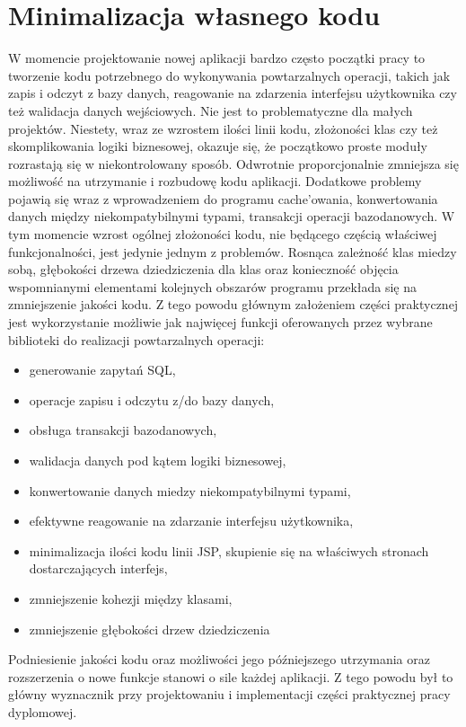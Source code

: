 	\section{Minimalizacja własnego kodu}
		W momencie projektowanie nowej aplikacji bardzo często początki pracy to tworzenie kodu potrzebnego do wykonywania powtarzalnych operacji, takich jak zapis i odczyt z bazy danych, reagowanie na zdarzenia interfejsu użytkownika czy też walidacja danych wejściowych. Nie jest to problematyczne dla małych projektów. Niestety, wraz ze wzrostem ilości linii kodu, złożoności klas czy też skomplikowania logiki biznesowej, okazuje się, że początkowo proste moduły rozrastają się w niekontrolowany sposób. Odwrotnie proporcjonalnie zmniejsza się możliwość na utrzymanie i rozbudowę kodu aplikacji. Dodatkowe problemy pojawią się wraz z wprowadzeniem do programu cache'owania, konwertowania danych między niekompatybilnymi typami, transakcji operacji bazodanowych. W tym momencie wzrost ogólnej złożoności kodu, nie będącego częścią właściwej funkcjonalności, jest jedynie jednym z problemów. Rosnąca zależność klas miedzy sobą, głębokości drzewa dziedziczenia dla klas oraz konieczność objęcia wspomnianymi elementami kolejnych obszarów programu przekłada się na zmniejszenie jakości kodu. Z tego powodu głównym założeniem części praktycznej jest wykorzystanie możliwie jak najwięcej funkcji oferowanych przez wybrane biblioteki do realizacji powtarzalnych operacji:
		\begin{itemize}
			\item generowanie zapytań SQL,
			\item operacje zapisu i odczytu z/do bazy danych,
			\item obsługa transakcji bazodanowych,
			\item walidacja danych pod kątem logiki biznesowej,
			\item konwertowanie danych miedzy niekompatybilnymi typami,
			\item efektywne reagowanie na zdarzanie interfejsu użytkownika,
			\item minimalizacja ilości kodu linii JSP, skupienie się na właściwych stronach dostarczających interfejs,
			\item zmniejszenie kohezji między klasami,
			\item zmniejszenie głębokości drzew dziedziczenia
		\end{itemize}
		Podniesienie jakości kodu oraz możliwości jego późniejszego utrzymania oraz rozszerzenia o nowe funkcje stanowi o sile każdej aplikacji. Z tego powodu był to główny wyznacznik przy projektowaniu i implementacji części praktycznej pracy dyplomowej.
